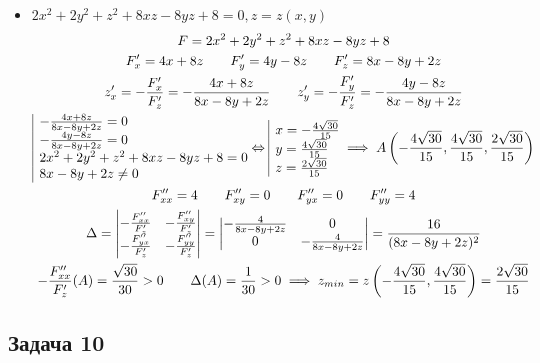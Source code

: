 \documentclass[a4paper,fleqn,12pt]{article}
\theoremstyle{definition}
\begin{document}
\begin{itemize}
\item $2x^2 + 2y^2 + z^2 + 8xz -8yz + 8 = 0, z = z(x,y)$
\begin{gather*}
F = 2x^2 + 2y^2 + z^2 + 8xz -8yz + 8 \\
F'_x = 4x+ 8z \qquad F'_y = 4y - 8z \qquad F'_z = 8x - 8y + 2z \\
z'_x = - \frac{F'_x}{F'_z} = - \frac{4x+ 8z}{8x - 8y + 2z}\qquad z'_y = -\frac{F'_y}{F'_z} = - \frac{4y - 8z}{8x - 8y + 2z}\\
\begin{array}{|l@{}}
- \frac{4x+ 8z}{8x - 8y + 2z} = 0 \\
- \frac{4y - 8z}{8x - 8y + 2z} = 0\\
2x^2 + 2y^2 + z^2 + 8xz -8yz + 8 = 0\\
8x - 8y + 2z \neq 0\\
\end{array}\Leftrightarrow 
\begin{array}{|l@{}}
x = - \frac{4 \sqrt{30}}{15}\\
y = \frac{4 \sqrt{30}}{15}\\
z = \frac{2 \sqrt{30}}{15}
\end{array} \implies 
A \left( - \frac{4 \sqrt{30}}{15}, \frac{4 \sqrt{30}}{15}, \frac{2 \sqrt{30}}{15}\right) \\
F''_{xx} = 4 \qquad F''_{xy} = 0 \qquad  F''_{yx} = 0 \qquad  F''_{yy} =4 \\
\Delta = \begin{vmatrix} -\frac{F''_{xx}}{F'_z} &  -\frac{F''_{xy}}{F'_z} \\  -\frac{F''_{yx}}{F'_z} &  -\frac{F''_{yy}}{F'_z} \end{vmatrix} = \begin{vmatrix} -\frac{4}{8x - 8y + 2z} & 0 \\  0 &  -\frac{4}{ 8x - 8y + 2z} \end{vmatrix} = \frac{16}{(8x - 8y + 2z)^2} \\
-\frac{F''_{xx}}{F'_z} (A) = \frac{\sqrt{30}}{30}>0 \qquad \Delta(A) = \frac{1}{30}>0 \implies z_{min} = z\left( - \frac{4 \sqrt{30}}{15}, \frac{4 \sqrt{30}}{15} \right) = \frac{2 \sqrt{30}}{15}
\end{gather*}
\end{itemize}

\subsection*{Задача 10}
\end{document}
